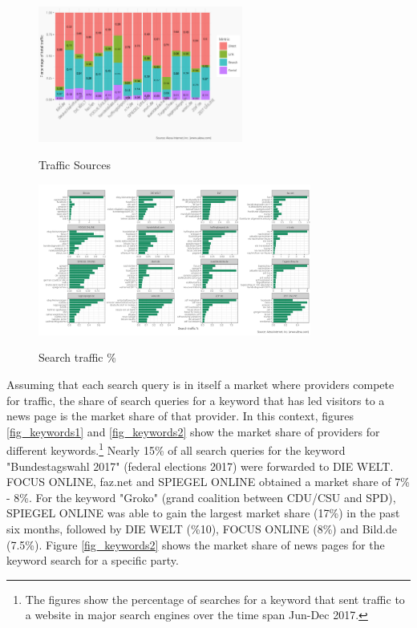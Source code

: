 \documentclass[12pt,a4paper,notitlepage]{article}
\begin{document}
\begin{figure}[H]
	\caption{Traffic Sources}
	\begin{center}
		\includegraphics[width=0.6\textwidth]{../figs/traffic_source.png}
		\label{fig_traffic}
	\end{center}
\end{figure}

\begin{figure}[H]
	\caption{Search traffic \%}
	\begin{center}
		\includegraphics[width=0.8\textwidth]{../figs/search_traffic.png}
		\label{fig_searchtraffic}
	\end{center}
\end{figure}

Assuming that each search query is in itself a market where providers compete for traffic, the share of search queries for a keyword that has led visitors to a news page is the market share of that provider. In this context, figures \ref{fig_keywords1} and \ref{fig_keywords2} show the market share of providers for different keywords.\footnote{The figures show the percentage of searches for a keyword that sent traffic to a website in major search engines over the time span Jun-Dec 2017.} Nearly 15\% of all search queries for the keyword "Bundestagswahl 2017" (federal elections 2017) were forwarded to DIE WELT. FOCUS ONLINE, faz.net and SPIEGEL ONLINE obtained a market share of 7\% - 8\%. For the keyword "Groko" (grand coalition between CDU/CSU and SPD), SPIEGEL ONLINE was able to gain the largest market share (17\%) in the past six months, followed by DIE WELT (\%10), FOCUS ONLINE (8\%) and Bild.de (7.5\%). Figure \ref{fig_keywords2} shows the market share of news pages for the keyword search for a specific party. 
\end{document}
